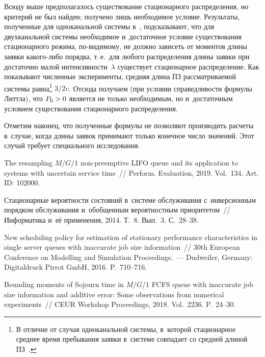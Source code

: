 \begin{multicols}{2}
Всюду выше предполагалось существование стационарного распределения,
но критерий не был найден; получено лишь необходимое условие.
Результаты, полученные для одноканальной системы в~\cite{xx2}, 
подсказывают, что для двухканальной системы 
необходимое и~достаточное условие существования стационарного режима,
по-видимому, не должно зависеть от моментов 
длины заявки какого-либо порядка, т.\,е.\ для любого
распределения длины заявки при достаточно малой интенсивности~$\lambda$ 
существует стационарное распределение. 
Как показывают численные эксперименты, средняя длина ПЗ 
рассматриваемой системы равна\footnote[1]{В отличие от случая 
одноканальной системы, в~которой стационарное среднее время пребывания 
заявки в~системе совпадает со средней длиной ПЗ~\cite[Corollary~3]{xx2}.} 
${3}/{2}v$.
Отсюда получаем (при условии справедливости формулы Литтла),
что $P_0\hm>0$ является не только необходимым, но и~достаточным условием 
существования стационарного распределения.
 
Отметим наконец, что полученные формулы не позволяют производить расчеты 
в~случае, 
когда длины заявок принимают только конечное число значений. 
Этот случай требует специального исследования. 

{\small\frenchspacing
 {%
 \begin{thebibliography}{9}

The resampling $M/G/1$ non-preemptive LIFO queue and its application to 
systems with uncertain service time~// Perform. Evaluation, 2019. 
Vol.~134. Art. ID: 102000.

Стационарные вероятности состояний в~системе обслуживания с~инверсионным 
порядком
обслуживания и~обобщенным вероятностным приоритетом~// Информатика и~её 
применения, 2014. Т.~8. Вып.~3. С.~28--38.



 New scheduling policy
for estimation of stationary performance characteristics in
single server queues with inaccurate job size information~//
30th European Conference on Modelling and Simulation
Proceedings.~--- Dudweiler, Germany: Digitaldruck Pirrot
GmbH, 2016. P.~710--716.

Bounding moments of Sojourn time in $M/G/1$ FCFS queue with inaccurate job 
size information and additive error: Some observations from numerical 
experiments~// CEUR Workshop Proceedings, 2018. Vol.~2236. P.~24--30.


\end{thebibliography}}}
\end{multicols}
